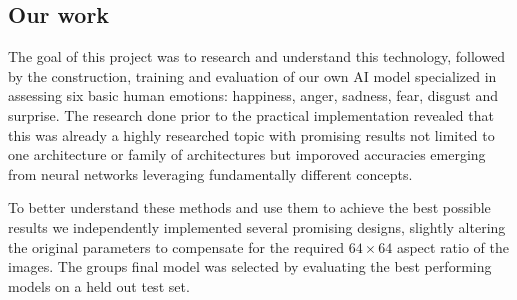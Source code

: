 \subsection{Our work}

The goal of this project was to research and understand this technology, followed by the construction, training and evaluation of our own AI model
specialized in assessing six basic human emotions: happiness, anger, sadness, fear, disgust and surprise. The research done prior to the practical implementation
revealed that this was already a highly researched topic with promising results not limited to one architecture or family of architectures but 
imporoved accuracies emerging from neural networks leveraging fundamentally different concepts. 

To better  understand these methods and use them to achieve the best possible results we independently implemented several promising designs, slightly altering 
the original parameters to compensate for the required $64 \times 64$ aspect ratio of the images. The groups final model was selected by evaluating the best performing
models on a held out test set. 
